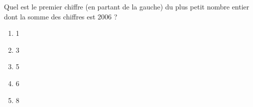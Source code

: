 Quel est le premier chiffre (en partant de la gauche) du plus petit
nombre entier dont la somme des chiffres est 2006 ?
\begin{multicols}{5}
  \begin{enumerate}[A/]
    \item 1
    \item 3
    \item 5
    \item 6
    \item 8
  \end{enumerate}
\end{multicols}